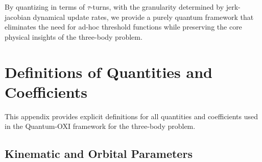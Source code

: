 \documentclass{article}
\begin{document}
By quantizing in terms of $\tau$-turns, with the granularity determined by jerk-jacobian dynamical update rates, we provide a purely quantum framework that eliminates the need for ad-hoc threshold functions while preserving the core physical insights of the three-body problem.

\appendix
\section{Definitions of Quantities and Coefficients}
\label{appendix:definitions}

This appendix provides explicit definitions for all quantities and coefficients used in the Quantum-OXI framework for the three-body problem.

\subsection{Kinematic and Orbital Parameters}
\end{document}
